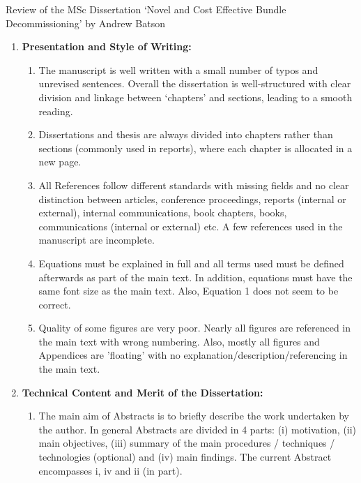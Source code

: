 \documentclass[14pt,twoside]{report}
\begin{document}


\bigskip

\begin{center}
{\Large Review of the MSc Dissertation `Novel and Cost Effective Bundle Decommissioning' by Andrew Batson}
\end{center}

\medskip

\begin{enumerate}
%
    \item {\bf Presentation and Style of Writing:}
                \begin{enumerate}
                   \item The manuscript is well written with a small number of typos and unrevised sentences. Overall the dissertation is well-structured with clear division and linkage between `chapters' and sections, leading to a smooth reading.
                   \item Dissertations and thesis are always divided into chapters rather than sections (commonly used in reports), where each chapter is allocated in a new page.
                   \item All References follow different standards with missing fields and no clear distinction between articles, conference proceedings, reports (internal or external), internal communications, book chapters, books, communications (internal or external) etc.  A few references used in the manuscript are incomplete.
                   \item Equations must be explained in full and all terms used must be defined afterwards as part of the main text. In addition, equations must have the same font size as the main text. Also, Equation 1 does not seem to be correct.
                   \item Quality of some figures are very poor. Nearly all figures are referenced in the main text with wrong numbering. Also, mostly all figures and Appendices are 'floating' with no explanation/description/referencing in the main text.
                \end{enumerate}
%
    \item {\bf Technical Content and Merit of the Dissertation:}
                \begin{enumerate}
                   \item The main aim of Abstracts is to briefly describe the work undertaken by the author. In general Abstracts are divided in 4 parts: (i) motivation, (ii) main objectives, (iii) summary of the main procedures / techniques / technologies (optional) and (iv) main findings. The current Abstract encompasses i, iv and ii (in part).

\end{enumerate}
\end{enumerate}
\end{document}
